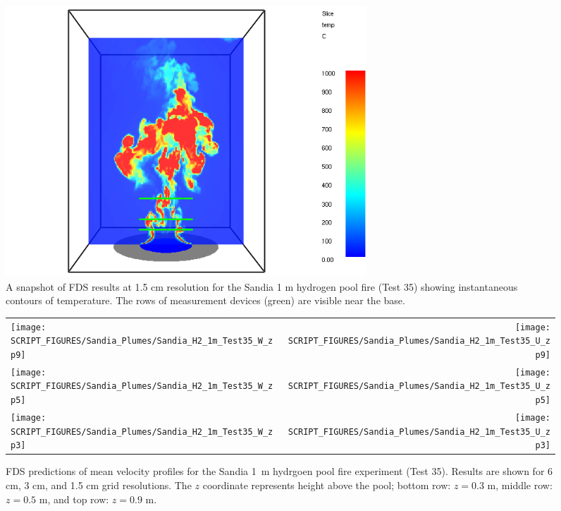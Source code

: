 \begin{figure}[h]
\begin{center}
\includegraphics[height=4in]{FIGURES/Sandia_Plumes/Sandia_H2_1m_image}
\caption[Sandia 1~m hydrogen pool fire instantaneous temperature contours]{A snapshot of FDS results at 1.5 cm resolution for the Sandia 1 m hydrogen pool fire (Test 35) showing instantaneous contours of temperature.  The rows of measurement devices (green) are visible near the base.}
\label{Sandia_H2_1m_image}
\end{center}
\end{figure}

\newpage

\begin{figure}[p]
\begin{tabular*}{\textwidth}{l@{\extracolsep{\fill}}r}
\texttt{[image: SCRIPT\_FIGURES/Sandia\_Plumes/Sandia\_H2\_1m\_Test35\_W\_zp9]} &
\texttt{[image: SCRIPT\_FIGURES/Sandia\_Plumes/Sandia\_H2\_1m\_Test35\_U\_zp9]} \\
\texttt{[image: SCRIPT\_FIGURES/Sandia\_Plumes/Sandia\_H2\_1m\_Test35\_W\_zp5]} &
\texttt{[image: SCRIPT\_FIGURES/Sandia\_Plumes/Sandia\_H2\_1m\_Test35\_U\_zp5]} \\
\texttt{[image: SCRIPT\_FIGURES/Sandia\_Plumes/Sandia\_H2\_1m\_Test35\_W\_zp3]} &
\texttt{[image: SCRIPT\_FIGURES/Sandia\_Plumes/Sandia\_H2\_1m\_Test35\_U\_zp3]}
\end{tabular*}
\caption[Sandia 1~m hydrogen pool fire (Test 35) mean velocity profiles]
{FDS predictions of mean velocity profiles for the Sandia 1~m hydrgoen pool fire experiment (Test 35). Results are shown for 6 cm, 3 cm, and 1.5 cm grid resolutions. The $z$ coordinate represents height above the pool; bottom row: $z=0.3$ m, middle row: $z=0.5$ m, and top row: $z=0.9$ m.}
\label{Sandia_H2_1m_Test35_velocity}
\end{figure}

